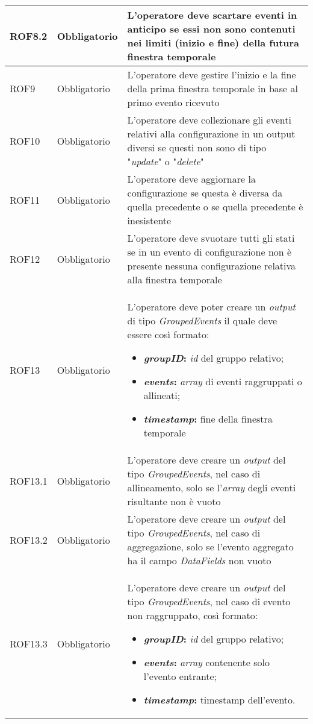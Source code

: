 {\begin{longtable}{L{3cm} L{3cm} L{7.5cm}}
ROF8.2 & Obbligatorio & L'operatore deve scartare eventi in anticipo se essi non sono contenuti nei limiti (inizio e fine) della futura finestra temporale\\
\hline
ROF9 & Obbligatorio & L'operatore deve gestire l'inizio e la fine della prima finestra temporale in base al primo evento ricevuto\\
\hline
ROF10 & Obbligatorio & L'operatore deve collezionare gli eventi relativi alla configurazione in un output diversi se questi non sono di tipo "\textit{update}" o "\textit{delete}"\\
\hline
ROF11 & Obbligatorio & L'operatore deve aggiornare la configurazione se questa è diversa da quella precedente o se quella precedente è inesistente\\
\hline
ROF12 & Obbligatorio & L'operatore deve svuotare tutti gli stati se in un evento di configurazione non è presente nessuna configurazione relativa alla finestra temporale\\
\hline
ROF13 & Obbligatorio & L'operatore deve poter creare un \textit{output} di tipo \textit{GroupedEvents} il quale deve essere così formato:
\begin{itemize}
	\item{\textbf{\textit{groupID}:} \textit{id} del gruppo relativo;}
	\item{\textbf{\textit{events}:} \textit{array} di eventi raggruppati o allineati;}
	\item{\textbf{\textit{\gls{timestamp}}:} fine della finestra temporale}
\end{itemize}\\
\hline
ROF13.1 & Obbligatorio & L'operatore deve creare un \textit{output} del tipo \textit{GroupedEvents}, nel caso di allineamento, solo se l'\textit{array} degli eventi risultante non è vuoto\\
\hline
ROF13.2 & Obbligatorio & L'operatore deve creare un \textit{output} del tipo \textit{GroupedEvents}, nel caso di aggregazione, solo se l'evento aggregato ha il campo \textit{DataFields} non vuoto\\
\hline
ROF13.3 & Obbligatorio & L'operatore deve creare un \textit{output} del tipo \textit{GroupedEvents}, nel caso di evento non raggruppato, così formato:
\begin{itemize}
	\item{\textbf{\textit{groupID}:} \textit{id} del gruppo relativo;}
	\item{\textbf{\textit{events}:} \textit{array} contenente solo l'evento entrante;}
	\item{\textbf{\textit{\gls{timestamp}}:} \gls{timestamp} dell'evento.}

\end{itemize}
\end{longtable}}
